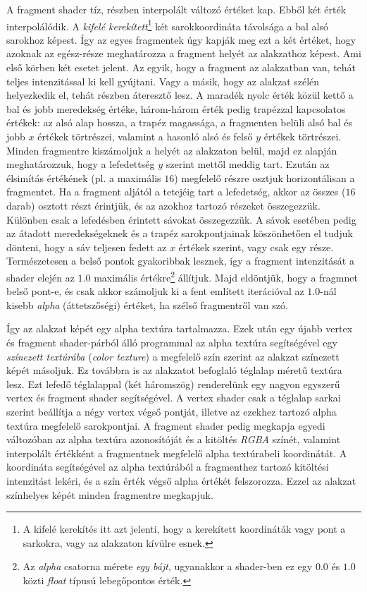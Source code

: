 \documentclass[12pt]{report}
\theoremstyle{definition}
\newcommand{\inenglish}[1]{\textsl{#1}}
\newcommand{\func}[1]{{\textsl{#1}}}
\begin{document}
A fragment shader tíz, részben interpolált változó értéket kap. Ebből két érték
interpolálódik. A \emph{kifelé kerekített}\footnote{A kifelé kerekítés itt azt
jelenti, hogy a kerekített koordináták vagy pont a sarkokra, vagy az alakzaton
kívülre esnek.} két sarokkoordináta távolsága a bal alsó sarokhoz képest. Így
az egyes fragmentek úgy kapják meg ezt a két értéket, hogy azoknak az
egész-része meghatározza a fragment helyét az alakzathoz képest. Ami első
körben két esetet jelent. Az egyik, hogy a fragment az alakzatban van, tehát
teljes intenzitással ki kell gyújtani. Vagy a másik, hogy az alakzat szélén
helyezkedik el, tehát részben áteresztő lesz. A maradék nyolc érték közül kettő
a bal és jobb meredekség értéke, három-három érték pedig trapézzal kapcsolatos
értékek: az alsó alap hossza, a trapéz magassága, a fragmenten belüli alsó bal
és jobb $x$ értékek törtrészei, valamint a hasonló alsó és felső $y$ értékek
törtrészei. Minden fragmentre kiszámoljuk a helyét az alakzaton belül, majd ez
alapján meghatározzuk, hogy a lefedettség $y$ szerint mettől meddig tart.
Ezután az élsimítás értékének (pl. a maximális $16$) megfelelő részre osztjuk
horizontálisan a fragmentet. Ha a fragment aljától a tetejéig tart a
lefedetség, akkor az összes ($16$ darab) osztott részt érintjük, és az azokhoz
tartozó részeket összegezzük. Különben csak a lefedésben érintett sávokat
összegezzük. A sávok esetében pedig az átadott meredekségeknek és a trapéz
sarokpontjainak köszönhetően el tudjuk dönteni, hogy a sáv teljesen fedett az
$x$ értékek szerint, vagy csak egy része. Természetesen a belső pontok
gyakoribbak lesznek, így a fragment intenzitását a shader elején az $1.0$
maximális értékre\footnote{Az \emph{alpha} csatorna mérete \emph{egy bájt},
ugyanakkor a shader-ben ez egy $0.0$ és $1.0$ közti \func{float} típusú
lebegőpontos érték.} állítjuk. Majd eldöntjük, hogy a fragmnet belső pont-e, és
csak akkor számoljuk ki a fent említett iterációval az $1.0$-nál kisebb
\emph{alpha} (áttetszőségi) értéket, ha szélső fragmentről van szó.

Így az alakzat képét egy alpha textúra tartalmazza. Ezek után egy újabb vertex
és fragment shader-párból álló programmal az alpha textúra segítségével egy
\emph{színezett textúrába} (\inenglish{color texture}) a megfelelő szín szerint
az alakzat színezett képét másoljuk. Ez továbbra is az alakzatot befoglaló
téglalap méretű textúra lesz. Ezt lefedő téglalappal (két háromszög)
renderelünk egy nagyon egyszerű vertex és fragment shader segítségével. A
vertex shader csak a téglalap sarkai szerint beállítja a négy vertex végső
pontját, illetve az ezekhez tartozó alpha textúra megfelelő sarokpontjai. A
fragment shader pedig megkapja egyedi változóban az alpha textúra azonosítóját
és a kitöltés \func{RGBA} színét, valamint interpolált értékként a fragmentnek
megfelelő alpha textúrabeli koordinátát. A koordináta segítségével az alpha
textúrából a fragmenthez tartozó kitöltési intenzitást lekéri, és a szín érték
végső alpha értékét felszorozza. Ezzel az alakzat színhelyes
képét minden fragmentre megkapjuk.
\end{document}
